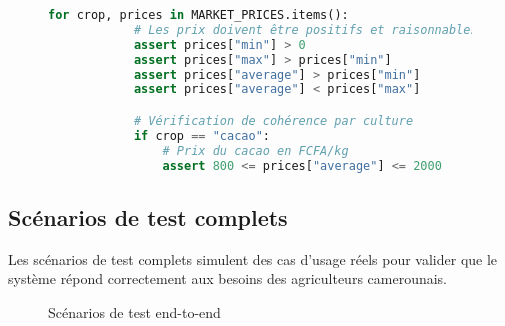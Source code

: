 \begin{figure}[h]
\begin{lstlisting}[language=Python, caption=Suite de tests d'intégration]
        for crop, prices in MARKET_PRICES.items():
            # Les prix doivent être positifs et raisonnables
            assert prices["min"] > 0
            assert prices["max"] > prices["min"]
            assert prices["average"] > prices["min"]
            assert prices["average"] < prices["max"]

            # Vérification de cohérence par culture
            if crop == "cacao":
                # Prix du cacao en FCFA/kg
                assert 800 <= prices["average"] <= 2000
\end{lstlisting}
\end{figure}

\subsection{Scénarios de test complets}

Les scénarios de test complets simulent des cas d'usage réels pour valider que le système répond correctement aux besoins des agriculteurs camerounais.

\begin{figure}[h]
\centering
{}
\caption{Scénarios de test end-to-end}
\end{figure}

